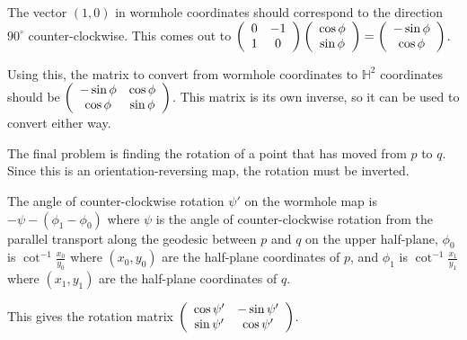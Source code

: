 The vector $(1,0)$ in wormhole coordinates should correspond to the direction $90^\circ$ counter-clockwise. This comes out to $\left(\begin{array}{ccc} 0 & -1 \\1 & 0 \end{array} \right)\left(\begin{array}{ccc} \cos\phi \\\sin\phi \end{array} \right) = \left(\begin{array}{ccc} -\sin\phi \\\cos\phi \end{array} \right)$.

Using this, the matrix to convert from wormhole coordinates to $\mathbb{H}^2$ coordinates should be $\left(\begin{array}{ccc} -\sin\phi & \cos\phi \\\cos\phi & \sin\phi \end{array} \right)$. This matrix is its own inverse, so it can be used to convert either way.


The final problem is finding the rotation of a point that has moved from $p$ to $q$. Since this is an orientation-reversing map, the rotation must be inverted.

The angle of counter-clockwise rotation $\psi'$ on the wormhole map is $-\psi-(\phi_1-\phi_0)$ where $\psi$ is the angle of counter-clockwise rotation from the parallel transport along the geodesic between $p$ and $q$ on the upper half-plane, $\phi_0$ is $\cot^{-1}\frac{x_0}{y_0}$ where $(x_0,y_0)$ are the half-plane coordinates of $p$, and $\phi_1$ is $\cot^{-1}\frac{x_1}{y_1}$ where $(x_1,y_1)$ are the half-plane coordinates of $q$.

This gives the rotation matrix $\left(\begin{array}{ccc} \cos\psi' & -\sin\psi' \\\sin\psi' & \cos\psi' \end{array} \right)$.

